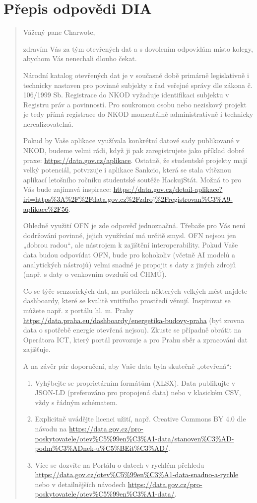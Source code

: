 \section*{Přepis odpovědi DIA}
\begin{quote}
Vážený pane Charwote,

zdravím Vás za tým otevřených dat a s dovolením odpovídám místo kolegy, abychom Vás nenechali dlouho čekat.

Národní katalog otevřených dat je v současné době primárně legislativně i technicky nastaven pro povinné subjekty z řad veřejné správy dle zákona č. 106/1999 Sb. Registrace do NKOD vyžaduje identifikaci subjektu v Registru práv a povinností. Pro soukromou osobu nebo neziskový projekt je tedy přímá registrace do NKOD momentálně administrativně i technicky nerealizovatelná.

Pokud by Vaše aplikace využívala konkrétní datové sady publikované v NKOD, budeme velmi rádi, když ji pak zaregistrujete jako příklad dobré praxe: \url{https://data.gov.cz/aplikace}. Ostatně, že studentské projekty mají velký potenciál, potvrzuje i aplikace Sankcio, která se stala vítěznou aplikací letošního ročníku studentské soutěže HackujStát. Možná to pro Vás bude zajímavá inspirace: \url{https://data.gov.cz/detail-aplikace?iri=https%3A%2F%2Fdata.gov.cz%2Fzdroj%2Fregistrovan%C3%A9-aplikace%2F56}.

Ohledně využití OFN je zde odpověď jednoznačná. Třebaže pro Vás není dodržování povinné, jejich využívání má určitě smysl. OFN nejsou jen „dobrou radou“, ale nástrojem k zajištění interoperability. Pokud Vaše data budou odpovídat OFN, bude pro kohokoliv (včetně AI modelů a analytických nástrojů) velmi snadné je propojit s daty z jiných zdrojů (např. s daty o venkovním ovzduší od ČHMÚ).

Co se týče senzorických dat, na portálech některých velkých měst najdete dashboardy, které se kvalitě vnitřního prostředí věnují. Inspirovat se můžete např. z portálu hl. m. Prahy \url{https://data.praha.eu/dashboardy/energetika-budovy-praha} (byť zrovna data o spotřebě energie otevřená nejsou). Zkuste se případně obrátit na Operátora ICT, který portál provozuje a pro Prahu sběr a zpracování dat zajišťuje.

A na závěr pár doporučení, aby Vaše data byla skutečně „otevřená“:
\begin{enumerate}
\item Vyhýbejte se proprietárním formátům (XLSX). Data publikujte v JSON-LD (preferováno pro propojená data) nebo v klasickém CSV, vždy s řádným schématem.
\item Explicitně uvádějte licenci užití, např. Creative Commons BY 4.0 dle návodu na \url{https://data.gov.cz/pro-poskytovatele/otev%C5%99en%C3%A1-data/stanoven%C3%AD-podm%C3%ADnek-u%C5%BEit%C3%AD/}.
\item Více se dozvíte na Portálu o datech v rychlém přehledu \url{https://data.gov.cz/otev%C5%99en%C3%A1-data-snadno-a-rychle} nebo v detailnějších návodech \url{https://data.gov.cz/pro-poskytovatele/otev%C5%99en%C3%A1-data/}.
\end{enumerate}


\end{quote}
